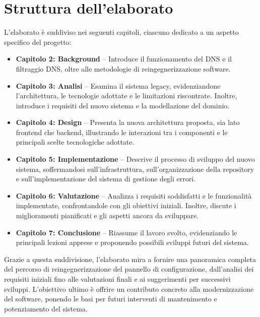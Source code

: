 \section{Struttura dell'elaborato}
L'elaborato è suddiviso nei seguenti capitoli, ciascuno dedicato a un aspetto specifico del progetto:

\begin{itemize}
  \item \textbf{Capitolo 2: Background} – Introduce il funzionamento del DNS e il filtraggio DNS, oltre alle metodologie di reingegnerizzazione software.
  \item \textbf{Capitolo 3: Analisi} – Esamina il sistema legacy, evidenziandone l’architettura, le tecnologie adottate e le limitazioni riscontrate. Inoltre, introduce i requisiti del nuovo sistema e la modellazione del dominio.
  \item \textbf{Capitolo 4: Design} – Presenta la nuova architettura proposta, sia lato frontend che backend, illustrando le interazioni tra i componenti e le principali scelte tecnologiche adottate.
  \item \textbf{Capitolo 5: Implementazione} – Descrive il processo di sviluppo del nuovo sistema, soffermandosi sull’infrastruttura, sull’organizzazione della repository e sull'implementazione del sistema di gestione degli errori.
  \item \textbf{Capitolo 6: Valutazione} – Analizza i requisiti soddisfatti e le funzionalità implementate, confrontandole con gli obiettivi iniziali. Inoltre, discute i miglioramenti pianificati e gli aspetti ancora da sviluppare.
  \item \textbf{Capitolo 7: Conclusione} – Riassume il lavoro svolto, evidenziando le principali lezioni apprese e proponendo possibili sviluppi futuri del sistema.
\end{itemize}

Grazie a questa suddivisione, l’elaborato mira a fornire una panoramica completa del percorso di reingegnerizzazione del pannello di configurazione, dall’analisi dei requisiti iniziali fino alle valutazioni finali e ai suggerimenti per successivi sviluppi. L’obiettivo ultimo è offrire un contributo concreto alla modernizzazione del software, ponendo le basi per futuri interventi di mantenimento e potenziamento del sistema.

